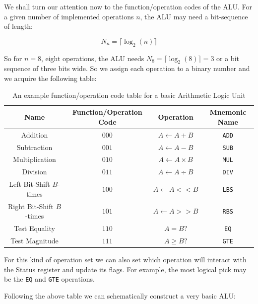 \newpage

We shall turn our attention now to the function/operation codes of the ALU. For a given number of implemented operations $n$, the ALU may need a bit-sequence of length:

\begin{equation}
    N_n=\lceil\log_2(n)\rceil
\end{equation}

So for $n=8$, eight operations, the ALU needs $N_8=\lceil\log_2(8)\rceil=3$ or a bit sequence of three bits wide. So we assign each operation to a binary number and we acquire the following table:

\begin{table}[!ht]
    \centering
    \begin{tabular}{c|c|c|c}
        Name & Function/Operation Code & Operation & Mnemonic Name\\
        \hline
        Addition        & $000$ & $A\leftarrow A+B$ & \verb|ADD|\\
        Subtraction     & $001$ & $A\leftarrow A-B$ & \verb|SUB|\\
        Multiplication  & $010$ & $A\leftarrow A\times B$ & \verb|MUL|\\
        Division        & $011$ & $A\leftarrow A\div B$ & \verb|DIV|\\
        Left Bit-Shift $B$-times  & $100$ & $A\leftarrow A<<B$ & \verb|LBS|\\
        Right Bit-Shift $B$-times & $101$ & $A\leftarrow A>>B$ & \verb|RBS|\\
        Test Equality   & $110$ & $A=B?$ & \verb|EQ|\\
        Test Magnitude  & $111$ & $A\geq B?$ & \verb|GTE|\\
    \end{tabular}
    \caption{An example function/operation code table for a basic Arithmetic Logic Unit}
\end{table}

For this kind of operation set we can also set which operation will interact with the Status register and update its flags. For example, the most logical pick may be
the \verb|EQ| and \verb|GTE| operations.

Following the above table we can schematically construct a very basic ALU:

